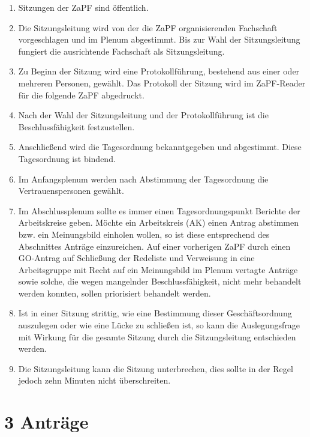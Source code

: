\documentclass[12pt,oneside]{scrartcl}
\begin{document}
\begin{enumerate}
\item Sitzungen der ZaPF sind öffentlich.

\item Die Sitzungsleitung wird von der die ZaPF organisierenden Fachschaft
vorgeschlagen und im Plenum abgestimmt.
Bis zur Wahl der Sitzungsleitung fungiert die ausrichtende Fachschaft als
Sitzungsleitung.

\item Zu Beginn der Sitzung wird eine Protokollführung, bestehend aus einer
oder mehreren Personen, gewählt.
Das Protokoll der Sitzung wird im ZaPF-Reader für die folgende ZaPF
abgedruckt.

\item Nach der Wahl der Sitzungsleitung und der Protokollführung ist die
Beschlussfähigkeit festzustellen.

\item Anschließend wird die Tagesordnung bekanntgegeben und abgestimmt.
Diese Tagesordnung ist bindend.

\item Im Anfangsplenum werden nach Abstimmung der Tagesordnung die
Vertrauenspersonen gewählt.

\item Im Abschlussplenum sollte es immer einen Tagesordnungspunkt \textquotedbl{}Berichte
der Arbeitskreise\textquotedbl{} geben.
Möchte ein Arbeitskreis (AK) einen Antrag abstimmen bzw. ein Meinungsbild
einholen wollen, so ist diese entsprechend des Abschnittes \textquotedbl{}Anträge\textquotedbl{}
einzureichen.
Auf einer vorherigen ZaPF durch einen GO-Antrag auf \textquotedbl{}Schließung der Redeliste
und Verweisung in eine Arbeitsgruppe mit Recht auf ein Meinungsbild im
Plenum\textquotedbl{} vertagte Anträge sowie solche, die wegen mangelnder
Beschlussfähigkeit, nicht mehr behandelt werden konnten, sollen priorisiert
behandelt werden.

\item Ist in einer Sitzung strittig, wie eine Bestimmung dieser Geschäftsordnung
auszulegen oder wie eine Lücke zu schließen ist, so kann die Auslegungsfrage
mit Wirkung für die gesamte Sitzung durch die Sitzungsleitung entschieden
werden.

\item Die Sitzungsleitung kann die Sitzung unterbrechen, dies sollte in der
Regel jedoch zehn Minuten nicht überschreiten.
\end{enumerate}


\section{3 Anträge%
  \label{antrage}%
}
\end{document}
